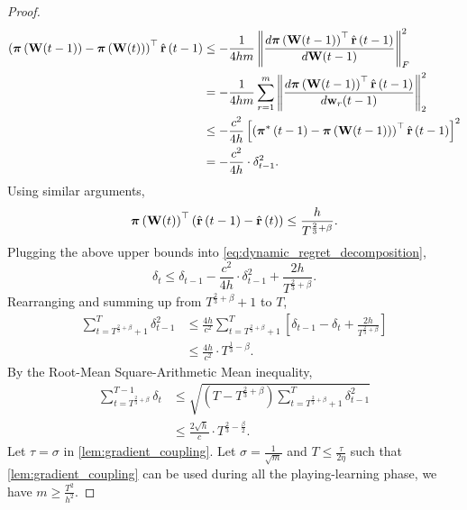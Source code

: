 \begin{proof}
\begin{equation*}
\begin{split}
    \left( {\boldsymbol{\pi}}\left( {\mathbf{W}}(t-1) \right) - {\boldsymbol{\pi}}\left( {\mathbf{W}}(t) \right) \right)^\top \hat{{\mathbf{r}}}\left(t-1\right) &\le - \frac{1}{4 h m} \left\| \frac{d {\boldsymbol{\pi}}\left( {\mathbf{W}}(t-1) \right)^\top \hat{{\mathbf{r}}}\left(t-1\right)}{d {\mathbf{W}}(t-1)} \right\|_F^2 \\
    &= - \frac{1}{4 h m} \sum\limits_{r=1}^{m}{ \left\| \frac{d {\boldsymbol{\pi}}\left( {\mathbf{W}}(t-1) \right)^\top \hat{{\mathbf{r}}}\left(t-1\right)}{d {\mathbf{w}}_r(t-1)} \right\|_2^2 } \\
    &\le - \frac{c^2}{4 h} \left[ \left( {{\boldsymbol{\pi}}^*\left(t-1\right)} - {\boldsymbol{\pi}}\left( {\mathbf{W}}(t-1) \right) \right)^\top \hat{{\mathbf{r}}}\left(t-1\right)  \right]^2 \\
    &= - \frac{c^2}{4 h} \cdot \delta_{t-1}^2.
\end{split}
\end{equation*}
Using similar arguments,
\begin{equation*}
    {\boldsymbol{\pi}}\left( {\mathbf{W}}(t) \right)^\top \left( \hat{{\mathbf{r}}}\left(t-1\right) - \hat{{\mathbf{r}}}\left(t\right)  \right) \le \frac{h}{T^{\frac{2}{3} + \beta}}.
\end{equation*}
Plugging the above upper bounds into \cref{eq:dynamic_regret_decomposition},
\begin{equation*}
    \delta_t \le \delta_{t-1} - \frac{c^2}{4 h} \cdot \delta_{t-1}^2 + \frac{2h}{T^{\frac{2}{3} + \beta}}.
\end{equation*}
Rearranging and summing up from $T^{\frac{2}{3} + \beta} + 1$ to $T$,
\begin{equation*}
\begin{split}
    \sum\limits_{t=T^{\frac{2}{3}+ \beta}+1}^{T}{\delta_{t-1}^2} &\le \frac{4 h}{ c^2} \sum\limits_{t=T^{\frac{2}{3}+ \beta}+1}^{T} { \left[ \delta_{t-1} - \delta_t + \frac{2h}{T^{\frac{2}{3} + \beta}} \right] } \\
    &\le \frac{4 h}{ c^2} \cdot T^{\frac{1}{3} - \beta}.
\end{split}
\end{equation*}
By the Root-Mean Square-Arithmetic Mean inequality,
\begin{equation*}
\begin{split}
    \sum\limits_{t=T^{\frac{2}{3}+ \beta}}^{T-1}{\delta_{t}} &\le \sqrt{\left(T  - T^{\frac{2}{3}+ \beta} \right) \sum\limits_{t=T^{\frac{2}{3}+ \beta}+1}^{T}{\delta_{t-1}^2}} \\
    &\le \frac{2 \sqrt{h}}{c} \cdot T^{\frac{2}{3} - \frac{\beta}{2}}.
\end{split}
\end{equation*}
Let $\tau = \sigma$ in \cref{lem:gradient_coupling}. Let $\sigma = \frac{1}{\sqrt{m}}$ and $T \le \frac{\tau}{2 \eta}$ such that \cref{lem:gradient_coupling} can be used during all the playing-learning phase, we have $m \ge \frac{T^2}{h^2}$.
\end{proof}



